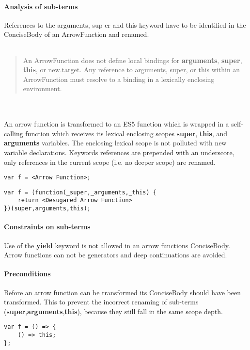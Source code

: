 \documentclass[10pt,a4paper]{article}
\begin{document}
\paragraph{Analysis of sub-terms}
References to the arguments, sup
er and this keyword have to be identified in the ConciseBody of an ArrowFunction and renamed.
\\
\\
\blockquote[{\cite[14.2.16]{SpecJS}}]{An ArrowFunction does not define local bindings for \textbf{arguments}, \textbf{super}, \textbf{this}, or new.target. Any reference to arguments, super, or this within an ArrowFunction must resolve to a binding in a lexically enclosing environment.}
\\\\
An arrow function is transformed to an ES5 function which is wrapped in a self-calling function which receives its lexical enclosing scopes \textbf{super}, \textbf{this}, and \textbf{arguments} variables. The enclosing lexical scope is not polluted with new variable declarations. Keywords references are prepended with an underscore, only references in the current scope (i.e. no deeper scope) are renamed.

\begin{lstlisting}
var f = <Arrow Function>;
\end{lstlisting}

\begin{lstlisting}
var f = (function(_super,_arguments,_this) {
	return <Desugared Arrow Function>
})(super,arguments,this);
\end{lstlisting}

\paragraph{Constraints on sub-terms}
Use of the \textbf{yield} keyword is not allowed in an arrow functions ConciseBody. Arrow functions can not be generators and deep continuations are avoided.

\paragraph{Preconditions}
Before an arrow function can be transformed its ConciseBody should have been transformed. This to prevent the incorrect renaming of sub-terms (\textbf{super},\textbf{arguments},\textbf{this}), because they still fall in the same scope depth.

\begin{lstlisting}
var f = () => {
	() => this;
};
\end{lstlisting}
\end{document}
